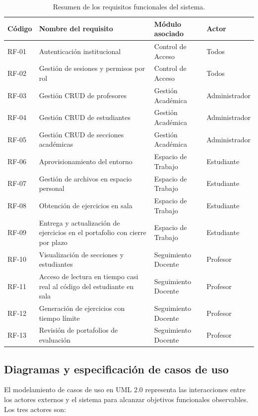 \begin{table}[H]
\centering
\caption{Resumen de los requisitos funcionales del sistema.}
\label{tab:resumen_rf}
\small
\begin{tabular}{l p{} p{} l}
\toprule
\textbf{Código} & \textbf{Nombre del requisito} & \textbf{Módulo asociado} & \textbf{Actor} \\
\midrule
RF-01 & Autenticación institucional & Control de Acceso & Todos \\
RF-02 & Gestión de sesiones y permisos por rol & Control de Acceso & Todos \\
RF-03 & Gestión CRUD de profesores & Gestión Académica & Administrador \\
RF-04 & Gestión CRUD de estudiantes & Gestión Académica & Administrador \\
RF-05 & Gestión CRUD de secciones académicas & Gestión Académica & Administrador \\
RF-06 & Aprovisionamiento del entorno & Espacio de Trabajo & Estudiante \\
RF-07 & Gestión de archivos en espacio personal & Espacio de Trabajo & Estudiante \\
RF-08 & Obtención de ejercicios en sala & Espacio de Trabajo & Estudiante \\
RF-09 & Entrega y actualización de ejercicios en el portafolio con cierre por plazo & Espacio de Trabajo & Estudiante \\
RF-10 & Visualización de secciones y estudiantes & Seguimiento Docente & Profesor \\
RF-11 & Acceso de lectura en tiempo casi real al código del estudiante en sala & Seguimiento Docente & Profesor \\
RF-12 & Generación de ejercicios con tiempo límite & Seguimiento Docente & Profesor \\
RF-13 & Revisión de portafolios de evaluación & Seguimiento Docente & Profesor \\
\bottomrule
\end{tabular}
\end{table}

\subsection{Diagramas y especificación de casos de uso}
\label{subsec:casos_de_uso}

El modelamiento de casos de uso en UML 2.0 representa las interacciones entre los actores externos y el sistema para alcanzar objetivos funcionales observables. Los tres actores son:

